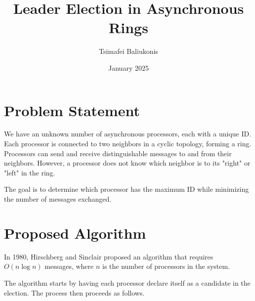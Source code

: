 \documentclass{article}
\title{Leader Election in Asynchronous Rings}
\author{Tsimafei Baliukonis}
\date{January 2025}
\begin{document}
\maketitle

\section{Problem Statement}
We have an unknown number of asynchronous processors, each with a unique ID. Each processor is connected to two neighbors in a cyclic topology, forming a ring. Processors can send and receive distinguishable messages to and from their neighbors. However, a processor does not know which neighbor is to its "right" or "left" in the ring.


\begin{center}
\end{center}

The goal is to determine which processor has the maximum ID while minimizing the number of messages exchanged.

\section{Proposed Algorithm}
In 1980, Hirschberg and Sinclair proposed an algorithm that requires $O(n \log n)$ messages, where $n$ is the number of processors in the system.

The algorithm starts by having each processor declare itself as a candidate in the election. The process then proceeds as follows.
\end{document}
